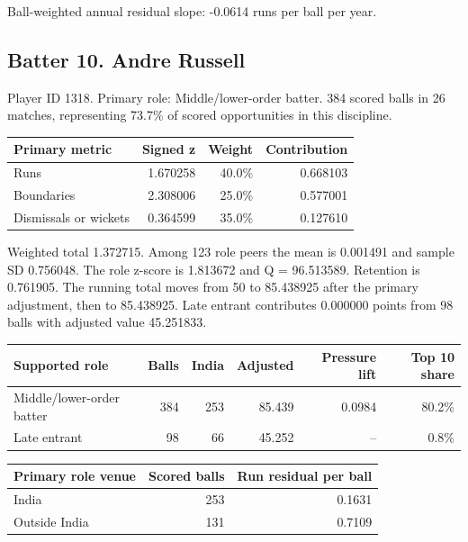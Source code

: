 Ball-weighted annual residual slope: -0.0614 runs per ball per year.

\clearpage

\subsection{Batter 10. Andre Russell}

Player ID 1318. Primary role: Middle/lower-order batter. 384 scored balls in 26 matches, representing 73.7\% of scored opportunities in this discipline.

\begin{center}
\begin{tabularx}{\linewidth}{>{\raggedright\arraybackslash}Xrrr}
\toprule
Primary metric & Signed z & Weight & Contribution \\
\midrule
Runs & 1.670258 & 40.0\% & 0.668103 \\
Boundaries & 2.308006 & 25.0\% & 0.577001 \\
Dismissals or wickets & 0.364599 & 35.0\% & 0.127610 \\
\bottomrule
\end{tabularx}
\end{center}

Weighted total 1.372715. Among 123 role peers the mean is 0.001491 and sample SD 0.756048. The role z-score is 1.813672 and Q = 96.513589. Retention is 0.761905. The running total moves from 50 to 85.438925 after the primary adjustment, then to 85.438925. Late entrant contributes 0.000000 points from 98 balls with adjusted value 45.251833.

\begin{center}
\begin{tabularx}{\linewidth}{>{\raggedright\arraybackslash}Xrrrrr}
\toprule
Supported role & Balls & India & Adjusted & Pressure lift & Top 10 share \\
\midrule
Middle/lower-order batter & 384 & 253 & 85.439 & 0.0984 & 80.2\% \\
Late entrant & 98 & 66 & 45.252 & -- & 0.8\% \\
\bottomrule
\end{tabularx}
\end{center}

\begin{center}
\begin{tabularx}{\linewidth}{>{\raggedright\arraybackslash}Xrr}
\toprule
Primary role venue & Scored balls & Run residual per ball \\
\midrule
India & 253 & 0.1631 \\
Outside India & 131 & 0.7109 \\
\bottomrule
\end{tabularx}
\end{center}

